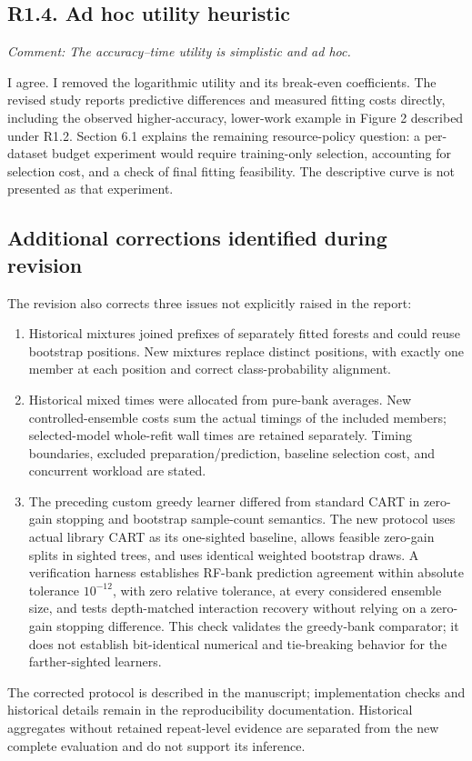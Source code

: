 \documentclass[11pt]{article}
\newcommand{\comment}[1]{\textit{Comment: #1}}
\begin{document}
\subsection*{R1.4. Ad hoc utility heuristic}
\comment{The accuracy--time utility is simplistic and ad hoc.}

I agree. I removed the logarithmic utility and its break-even coefficients. The revised study reports predictive differences and measured fitting costs directly, including the observed higher-accuracy, lower-work example in Figure 2 described under R1.2. Section 6.1 explains the remaining resource-policy question: a per-dataset budget experiment would require training-only selection, accounting for selection cost, and a check of final fitting feasibility. The descriptive curve is not presented as that experiment.

\subsection*{Additional corrections identified during revision}
The revision also corrects three issues not explicitly raised in the report:
\begin{enumerate}
\item Historical mixtures joined prefixes of separately fitted forests and could reuse bootstrap positions. New mixtures replace distinct positions, with exactly one member at each position and correct class-probability alignment.
\item Historical mixed times were allocated from pure-bank averages. New controlled-ensemble costs sum the actual timings of the included members; selected-model whole-refit wall times are retained separately. Timing boundaries, excluded preparation/prediction, baseline selection cost, and concurrent workload are stated.
\item The preceding custom greedy learner differed from standard CART in zero-gain stopping and bootstrap sample-count semantics. The new protocol uses actual library CART as its one-sighted baseline, allows feasible zero-gain splits in sighted trees, and uses identical weighted bootstrap draws. A verification harness establishes RF-bank prediction agreement within absolute tolerance $10^{-12}$, with zero relative tolerance, at every considered ensemble size, and tests depth-matched interaction recovery without relying on a zero-gain stopping difference. This check validates the greedy-bank comparator; it does not establish bit-identical numerical and tie-breaking behavior for the farther-sighted learners.
\end{enumerate}
The corrected protocol is described in the manuscript; implementation checks and historical details remain in the reproducibility documentation. Historical aggregates without retained repeat-level evidence are separated from the new complete evaluation and do not support its inference.
\end{document}
